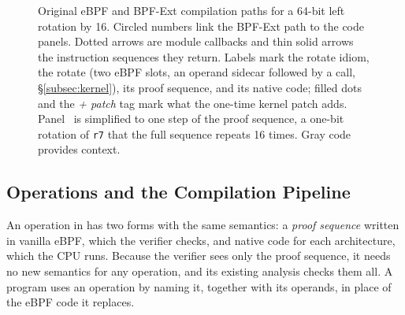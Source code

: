 \begin{figure}[t]
\endgroup
\caption{Original eBPF and BPF-Ext compilation paths for a 64-bit left rotation by 16. Circled numbers link the BPF-Ext path to the code panels. Dotted arrows are module callbacks and thin solid arrows the instruction sequences they return. Labels mark the rotate idiom, the \lang rotate (two eBPF slots, an operand sidecar followed by a call, \S\ref{subsec:kernel}), its proof sequence, and its native code; filled dots and the \emph{+ patch} tag mark what the one-time kernel patch adds. Panel~ is simplified to one step of the proof sequence, a one-bit rotation of \texttt{r7} that the full sequence repeats 16 times. Gray code provides context.}
\label{fig:pipeline}
\end{figure}

\subsection{Operations and the Compilation Pipeline}
\label{subsec:pipeline}

An operation in \tool has two forms with the same semantics: a \emph{proof sequence} written in vanilla eBPF, which the verifier checks, and native code for each architecture, which the CPU runs.
Because the verifier sees only the proof sequence, it needs no new semantics for any operation, and its existing analysis checks them all.
A program uses an operation by naming it, together with its operands, in place of the eBPF code it replaces.

